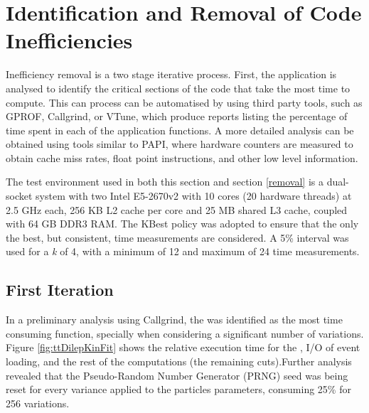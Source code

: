 \section{Identification and Removal of Code Inefficiencies}
\label{identification}

Inefficiency removal is a two stage iterative process. First, the application is analysed to identify the critical sections of the code that take the most time to compute. This can process can be automatised by using third party tools, such as GPROF, Callgrind, or VTune, which produce reports listing the percentage of time spent in each of the application functions. A more detailed analysis can be obtained using tools similar to PAPI, where hardware counters are measured to obtain cache miss rates, float point instructions, and other low level information.

The test environment used in both this section and section \ref{removal} is a dual-socket system with two Intel E5-2670v2 with 10 cores (20 hardware threads) at 2.5 GHz each, 256 KB L2 cache per core and 25 MB shared L3 cache, coupled with 64 GB DDR3 RAM. The KBest policy was adopted to ensure that the only the best, but consistent, time measurements are considered. A 5\% interval was used for a \textit{k} of 4, with a minimum of 12 and maximum of 24 time measurements.

\subsection{First Iteration}

In a preliminary analysis using Callgrind, the \ttDilepKinFit was identified as the most time consuming function, specially when considering a significant number of variations. Figure \ref{fig:ttDilepKinFit} shows the relative execution time for the \ttDilepKinFit, I/O of event loading, and the rest of the computations (the remaining cuts).Further analysis revealed that the Pseudo-Random Number Generator (PRNG) seed was being reset for every variance applied to the particles parameters, consuming 25\% for 256 variations.

